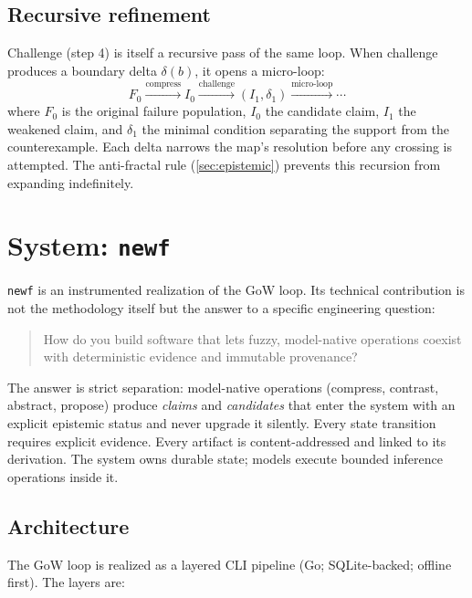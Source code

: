 \documentclass[11pt]{article}
\theoremstyle{gowthm}
\theoremstyle{gowplain}
\begin{document}
\subsection{Recursive refinement}

Challenge (step 4) is itself a recursive pass of the same loop. When challenge
produces a boundary delta $\delta(b)$, it opens a micro-loop:
\[
F_0
\xrightarrow{\text{compress}} I_0
\xrightarrow{\text{challenge}} (I_1, \delta_1)
\xrightarrow{\text{micro-loop}} \cdots
\]
where $F_0$ is the original failure population, $I_0$ the candidate claim,
$I_1$ the weakened claim, and $\delta_1$ the minimal condition separating the
support from the counterexample. Each delta narrows the map's resolution before
any crossing is attempted. The anti-fractal rule (\cref{sec:epistemic}) prevents
this recursion from expanding indefinitely.

\section{System: \texttt{newf}}
\label{sec:system}

\texttt{newf} is an instrumented realization of the GoW loop. Its technical
contribution is not the methodology itself but the answer to a specific
engineering question:

\begin{quote}
How do you build software that lets fuzzy, model-native operations coexist
with deterministic evidence and immutable provenance?
\end{quote}

The answer is strict separation: model-native operations (compress, contrast,
abstract, propose) produce \emph{claims} and \emph{candidates} that enter the
system with an explicit epistemic status and never upgrade it silently. Every
state transition requires explicit evidence. Every artifact is content-addressed
and linked to its derivation. The system owns durable state; models execute
bounded inference operations inside it.

\subsection{Architecture}

The GoW loop is realized as a layered CLI pipeline (Go; SQLite-backed; offline
first). The layers are:
\end{document}
